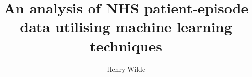 \documentclass{beamer}
\title{An analysis of NHS patient-episode data utilising machine learning
    techniques}
\author{Henry Wilde}
\begin{document}
\frame{%
    \titlepage%
}

\graphicspath{{./img/general/}}


\graphicspath{{./img/diabetes/}}







\end{document}
